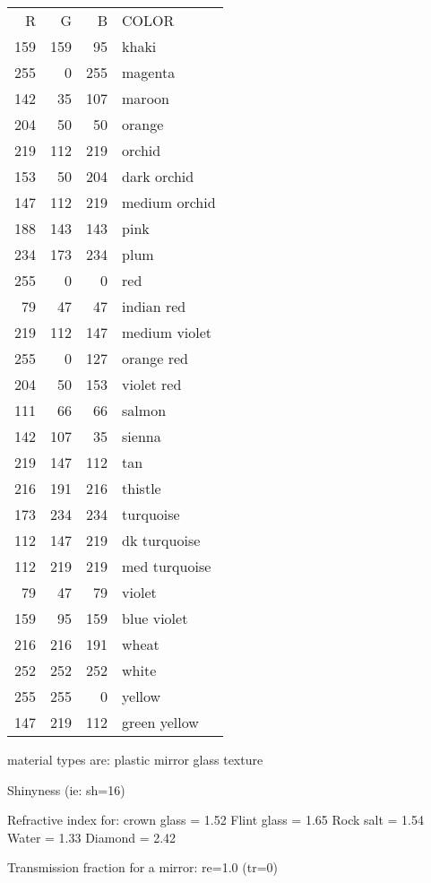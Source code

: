 \begin{tabular}{r r r l}
R & G & B &         COLOR \\
159 & 159 & 95 & khaki  \\
255 & 0 & 255 & magenta \\
142 & 35 & 107 & maroon \\
204 & 50 & 50 & orange \\
219 & 112 & 219 & orchid \\
153 & 50 & 204 & dark orchid \\
147 & 112 & 219 & medium orchid \\
188 & 143 & 143 & pink \\
234 & 173 & 234 & plum \\
255 & 0 & 0 & red \\
79 & 47 & 47 & indian red \\
219 & 112 & 147 & medium violet \\
255 & 0 & 127 & orange red \\
204 & 50 & 153 & violet red \\
111 & 66 & 66 & salmon \\
142 & 107 & 35 & sienna \\
219 & 147 & 112 & tan \\
216 & 191 & 216 & thistle \\
173 & 234 & 234 & turquoise \\
112 & 147 & 219 & dk turquoise \\
112 & 219 & 219 & med turquoise \\
79 & 47 & 79 & violet \\
159 & 95 & 159 & blue violet \\
216 & 216 & 191 & wheat \\
252 & 252 & 252 & white \\
255 & 255 & 0 & yellow \\
147 & 219 & 112 & green yellow
\end{tabular}

material types are:  plastic
                               mirror
                               glass
                               texture

Shinyness (ie:  sh=16)
     
Refractive index for:  crown glass = 1.52
                              Flint glass = 1.65
                              Rock salt = 1.54
                              Water = 1.33
                              Diamond = 2.42

Transmission fraction for a mirror:  re=1.0 (tr=0)

